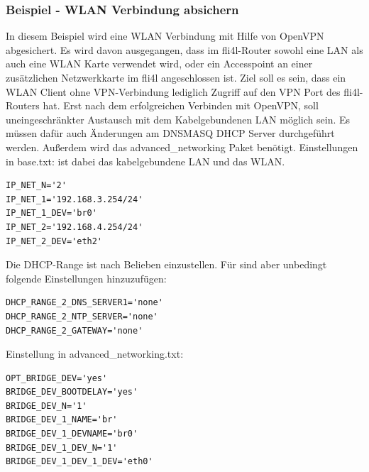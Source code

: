 \subsubsection{Beispiel - WLAN Verbindung absichern}

In diesem Beispiel wird eine WLAN Verbindung mit Hilfe von OpenVPN
abgesichert. Es wird davon ausgegangen, dass im fli4l-Router sowohl
eine LAN als auch eine WLAN Karte verwendet wird, oder ein Accesspoint
an einer zusätzlichen Netzwerkkarte im fli4l angeschlossen ist. Ziel
soll es sein, dass ein WLAN Client ohne VPN-Verbindung lediglich
Zugriff auf den VPN Port des fli4l-Routers hat. Erst nach dem
erfolgreichen Verbinden mit OpenVPN, soll uneingeschränkter Austausch
mit dem Kabelgebundenen LAN möglich sein.  Es müssen dafür auch
Änderungen am DNSMASQ DHCP Server durchgeführt werden.  Außerdem wird
das advanced\_networking Paket benötigt.  Einstellungen in base.txt:
 ist dabei das kabelgebundene LAN und 
das WLAN.
\begin{example}
\begin{verbatim}
IP_NET_N='2'
IP_NET_1='192.168.3.254/24'
IP_NET_1_DEV='br0'
IP_NET_2='192.168.4.254/24'
IP_NET_2_DEV='eth2'
\end{verbatim}
\end{example}

Die DHCP-Range ist nach Belieben einzustellen.  Für 
sind aber unbedingt folgende Einstellungen hinzuzufügen:

\begin{example}
\begin{verbatim}
DHCP_RANGE_2_DNS_SERVER1='none'  
DHCP_RANGE_2_NTP_SERVER='none'  
DHCP_RANGE_2_GATEWAY='none' 
\end{verbatim}
\end{example}

Einstellung in advanced\_networking.txt:
\begin{example}
\begin{verbatim}
OPT_BRIDGE_DEV='yes'
BRIDGE_DEV_BOOTDELAY='yes'
BRIDGE_DEV_N='1'
BRIDGE_DEV_1_NAME='br'
BRIDGE_DEV_1_DEVNAME='br0'
BRIDGE_DEV_1_DEV_N='1'
BRIDGE_DEV_1_DEV_1_DEV='eth0'
\end{verbatim}
\end{example}

